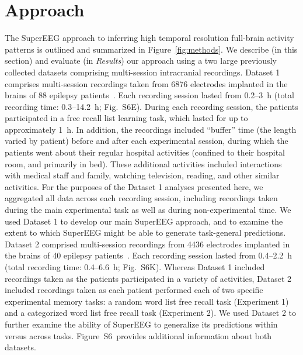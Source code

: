 \documentclass[11pt]{article}
\newcommand{\suppstats}{S6}
\begin{document}
\section*{Approach} The SuperEEG approach to inferring high temporal resolution
full-brain activity patterns is outlined and summarized in
Figure~\ref{fig:methods}. We describe (in this section) and evaluate (in
\textit{Results}) our approach using a two large previously collected datasets
comprising multi-session intracranial recordings. Dataset 1 comprises
multi-session recordings taken from 6876 electrodes implanted in the brains of
88 epilepsy patients~\citep{SedeEtal03, SedeEtal07a, SedeEtal07b, MannEtal11,
MannEtal12}.  Each recording session lasted from 0.2--3~h (total recording time:
0.3--14.2~h; Fig.~\suppstats E).  During each recording session, the patients
participated in a free recall list learning task, which lasted for up to
approximately 1~h.  In addition, the recordings included ``buffer'' time (the
length varied by patient) before and after each experimental session, during
which the patients went about their regular hospital activities (confined to
their hospital room, and primarily in bed).  These additional activities
included interactions with medical staff and family, watching television,
reading, and other similar activities.  For the purposes of the Dataset 1
analyses presented here, we aggregated all data across each recording session,
including recordings taken during the main experimental task as well as during
non-experimental time.  We used Dataset 1 to develop our main SuperEEG approach,
and to examine the extent to which SuperEEG might be able to generate
task-general predictions.  Dataset 2 comprised multi-session recordings from
4436 electrodes implanted in the brains of 40 epilepsy
patients~\citep{EzzyEtal17, HoraEtal17, KragEtal17, KuceEtal17, LinEtal17,
SoloEtal18, WeidEtal18, EzzyEtal18, KuceEtal18}.  Each recording session lasted
from 0.4--2.2~h (total recording time: 0.4--6.6~h; Fig.~\suppstats K).  Whereas
Dataset 1 included recordings taken as the patients participated in a variety of
activities, Dataset 2 included recordings taken as each patient performed each
of two specific experimental memory tasks: a random word list free recall task
(Experiment 1) and a categorized word list free recall task (Experiment 2).  We
used Dataset 2 to further examine the ability of SuperEEG to generalize its
predictions within versus across tasks.  Figure~\suppstats~provides additional
information about both datasets.
\end{document}
